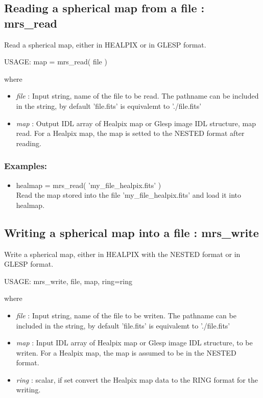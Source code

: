 \subsection{Reading a spherical map from a file : mrs\_read}
Read a spherical map, either in HEALPIX or in GLESP format.
{\bf
\begin{center}
     USAGE: map = mrs\_read( file )
\end{center}}
where
\begin{itemize}
\item {\em file} : Input string, name of the file to be read. The pathname can be included in the string, by default 'file.fits' is equivalemt to './file.fits'
\item {\em map} : Output IDL array of Healpix map or Glesp image IDL structure, map read. For a Healpix map, the map is setted to the NESTED format after reading.
\end{itemize}

\subsubsection*{Examples:} 
\begin{itemize}
\item healmap = mrs\_read( 'my\_file\_healpix.fits' ) \\
Read the map stored into the file 'my\_file\_healpix.fits' and load it into healmap.
\end{itemize}



\subsection{Writing a spherical map into a file : mrs\_write}
Write a spherical map, either in HEALPIX with the NESTED format or in GLESP format.
{\bf
\begin{center}
     USAGE: mrs\_write, file, map, ring=ring
\end{center}}
where
\begin{itemize}
\item {\em file} : Input string, name of the file to be writen. The pathname can be included in the string, by default 'file.fits' is equivalemt to './file.fits'
\item {\em map} : Input IDL array of Healpix map or Glesp image IDL structure, to be writen. For a Healpix map, the map is assumed to be in the NESTED format.
\item {\em ring} : scalar, if set convert the Healpix map data to the RING format for the writing.
\end{itemize}

